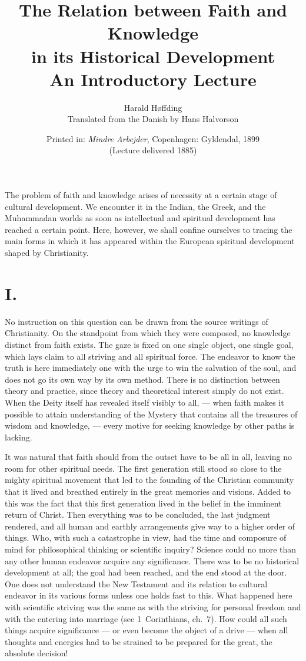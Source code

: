 \documentclass[12pt,a4paper]{article}
\title{\textbf{The Relation between Faith and Knowledge\\[4pt]
       in its Historical Development}\\[6pt]
  \large An Introductory Lecture}
\author{Harald Høffding\\[4pt]
  \small Translated from the Danish by Hans Halvorson}
\date{Printed in: \emph{Mindre Arbejder}, Copenhagen: Gyldendal, 1899\\
  (Lecture delivered 1885)}
\begin{document}
\maketitle
\thispagestyle{fancy}

\bigskip

\noindent The problem of faith and knowledge arises of necessity at a
certain stage of cultural development. We encounter it in the Indian,
the Greek, and the Muhammadan worlds as soon as intellectual and
spiritual development has reached a certain point. Here, however, we
shall confine ourselves to tracing the main forms in which it has
appeared within the European spiritual development shaped by
Christianity.

\section*{I.}

No instruction on this question can be drawn from the source writings
of Christianity. On the standpoint from which they were composed, no
knowledge distinct from faith exists. The gaze is fixed on one single
object, one single goal, which lays claim to all striving and all
spiritual force. The endeavor to know the truth is here immediately one
with the urge to win the salvation of the soul, and does not go its own
way by its own method. There is no distinction between theory and
practice, since theory and theoretical interest simply do not exist.
When the Deity itself has revealed itself visibly to all, --- when faith
makes it possible to attain understanding of the Mystery that contains
all the treasures of wisdom and knowledge, --- every motive for seeking
knowledge by other paths is lacking.

It was natural that faith should from the outset have to be all in all,
leaving no room for other spiritual needs. The first generation still
stood so close to the mighty spiritual movement that led to the founding
of the Christian community that it lived and breathed entirely in the
great memories and visions. Added to this was the fact that this first
generation lived in the belief in the imminent return of Christ. Then
everything was to be concluded, the last judgment rendered, and all human
and earthly arrangements give way to a higher order of things. Who, with
such a catastrophe in view, had the time and composure of mind for
philosophical thinking or scientific inquiry? Science could no more than
any other human endeavor acquire any significance. There was to be no
historical development at all; the goal had been reached, and the end
stood at the door. One does not understand the New Testament and its
relation to cultural endeavor in its various forms unless one holds fast
to this. What happened here with scientific striving was the same as with
the striving for personal freedom and with the entering into marriage
(see 1~Corinthians, ch.~7). How could all such things acquire
significance --- or even become the object of a drive --- when all
thoughts and energies had to be strained to be prepared for the great,
the absolute decision!
\end{document}
